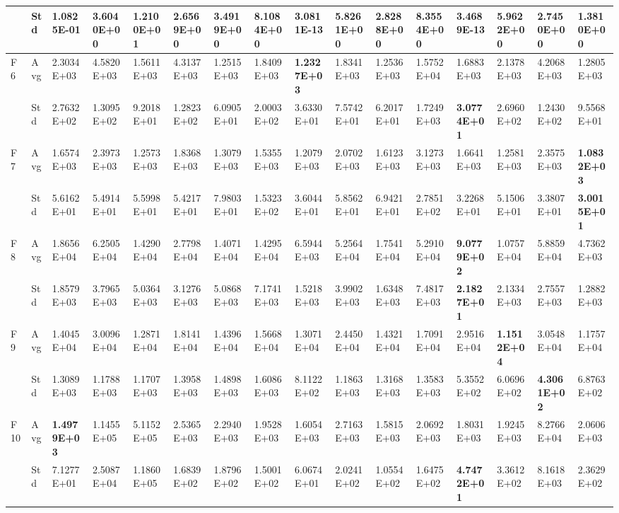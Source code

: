 \documentclass{article} %
\begin{document}
\begin{tabular}{|p{0.3in}|p{0.3in}|p{0.3in}|p{0.3in}|p{0.3in}|p{0.3in}|p{0.3in}|p{0.3in}|p{0.3in}|p{0.3in}|p{0.3in}|p{0.3in}|p{0.3in}|p{0.3in}|p{0.3in}|p{0.5in}|}
 & Std & 1.0825E-01 & 3.6040E+00 & 1.2100E+01 & 2.6569E+00 & 3.4919E+00 & 8.1084E+00 & \textbf{3.0811E-13} & 5.8261E+00 & 2.8288E+00 & 8.3554E+00 & 3.4689E-13 & 5.9622E+00 & 2.7450E+00 & 1.3810E+00 \\ \hline 
F6 & Avg & 2.3034E+03 & 4.5820E+03 & 1.5611E+03 & 4.3137E+03 & 1.2515E+03 & 1.8409E+03 & \textbf{1.2327E+03} & 1.8341E+03 & 1.2536E+03 & 1.5752E+04 & 1.6883E+03 & 2.1378E+03 & 4.2068E+03 & 1.2805E+03 \\ \hline 
 & Std & 2.7632E+02 & 1.3095E+02 & 9.2018E+01 & 1.2823E+02 & 6.0905E+01 & 2.0003E+02 & 3.6330E+01 & 7.5742E+01 & 6.2017E+01 & 1.7249E+03 & \textbf{3.0774E+01} & 2.6960E+02 & 1.2430E+02 & 9.5568E+01 \\ \hline 
F7 & Avg & 1.6574E+03 & 2.3973E+03 & 1.2573E+03 & 1.8368E+03 & 1.3079E+03 & 1.5355E+03 & 1.2079E+03 & 2.0702E+03 & 1.6123E+03 & 3.1273E+03 & 1.6641E+03 & 1.2581E+03 & 2.3575E+03 & \textbf{1.0832E+03} \\ \hline 
 & Std & 5.6162E+01 & 5.4914E+01 & 5.5998E+01 & 5.4217E+01 & 7.9803E+01 & 1.5323E+02 & 3.6044E+01 & 5.8562E+01 & 6.9421E+01 & 2.7851E+02 & 3.2268E+01 & 5.1506E+01 & 3.3807E+01 & \textbf{3.0015E+01} \\ \hline 
F8 & Avg & 1.8656E+04 & 6.2505E+04 & 1.4290E+04 & 2.7798E+04 & 1.4071E+04 & 1.4295E+04 & 6.5944E+03 & 5.2564E+04 & 1.7541E+04 & 5.2910E+04 & \textbf{9.0779E+02} & 1.0757E+04 & 5.8859E+04 & 4.7362E+03 \\ \hline 
 & Std & 1.8579E+03 & 3.7965E+03 & 5.0364E+03 & 3.1276E+03 & 5.0868E+03 & 7.1741E+03 & 1.5218E+03 & 3.9902E+03 & 1.6348E+03 & 7.4817E+03 & \textbf{2.1827E+01} & 2.1334E+03 & 2.7557E+03 & 1.2882E+03 \\ \hline 
F9 & Avg & 1.4045E+04 & 3.0096E+04 & 1.2871E+04 & 1.8141E+04 & 1.4396E+04 & 1.5668E+04 & 1.3071E+04 & 2.4450E+04 & 1.4321E+04 & 1.7091E+04 & 2.9516E+04 & \textbf{1.1512E+04} & 3.0548E+04 & 1.1757E+04 \\ \hline 
 & Std & 1.3089E+03 & 1.1788E+03 & 1.1707E+03 & 1.3958E+03 & 1.4898E+03 & 1.6086E+03 & 8.1122E+02 & 1.1863E+03 & 1.3168E+03 & 1.3583E+03 & 5.3552E+02 & 6.0696E+02 & \textbf{4.3061E+02} & 6.8763E+02 \\ \hline 
F10 & Avg & \textbf{1.4979E+03} & 1.1455E+05 & 5.1152E+05 & 2.5365E+03 & 2.2940E+03 & 1.9528E+03 & 1.6054E+03 & 2.7163E+03 & 1.5815E+03 & 2.0692E+03 & 1.8031E+03 & 1.9245E+03 & 8.2766E+04 & 2.0606E+03 \\ \hline 
 & Std & 7.1277E+01 & 2.5087E+04 & 1.1860E+05 & 1.6839E+02 & 1.8796E+02 & 1.5001E+02 & 6.0674E+01 & 2.0241E+02 & 1.0554E+02 & 1.6475E+02 & \textbf{4.7472E+01} & 3.3612E+02 & 8.1618E+03 & 2.3629E+02 \\ \hline 

\end{tabular}
\end{document}
